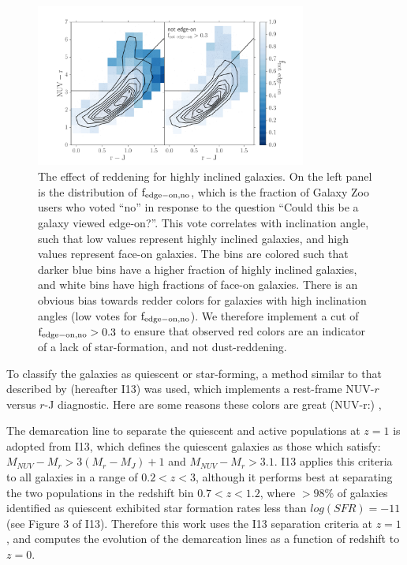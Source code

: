 \documentclass[useAMS,usenatbib]{mn2e}
\begin{document}
\begin{figure}
\centering
\includegraphics[width=3.5in,trim={1cm 0cm 1cm 1cm},clip]{figures/edgeon_colorcolor.pdf}
\caption{The effect of reddening for highly inclined galaxies. On the left panel is the distribution of $\rm f_{edge-on,no}$, which is the fraction of Galaxy Zoo users who voted ``no'' in response to the question ``Could this be a galaxy viewed edge-on?''. This vote correlates with inclination angle, such that low values represent highly inclined galaxies, and high values represent face-on galaxies. The bins are colored such that darker blue bins have a higher fraction of highly inclined galaxies, and white bins have high fractions of face-on galaxies. There is an obvious bias towards redder colors for galaxies with high inclination angles (low votes for $\rm f_{edge-on,no}$). We therefore implement a cut of $\rm f_{edge-on,no}>0.3$ to ensure that observed red colors are an indicator of a lack of star-formation, and not dust-reddening. }
\label{fig:edgeon}
\end{figure}
To classify the galaxies as quiescent or star-forming, a method similar to that described by \citet{Ilbert2013} (hereafter I13) was used, which implements a rest-frame NUV-$r$ versus $r$-J diagnostic. Here are some reasons these colors are great (NUV-r:) \citep{Arnouts2007a,Salim2005a,Wyder2007},\citep{Martin2007}

The demarcation line to separate the quiescent and active populations at $z=1$ is adopted from I13, which defines the quiescent galaxies as those which satisfy: $M_{NUV}-M_{r} > 3(M_{r}-M_{J})+1$ and $M_{NUV}-M_{r} > 3.1$. I13 applies this criteria to all galaxies in a range of $0.2<z<3$, although it performs best at separating the two populations in the redshift bin $0.7<z<1.2$, where $>98\%$ of galaxies identified as quiescent exhibited star formation rates less than $log(SFR) = -11$ (see Figure 3 of I13). Therefore this work uses the I13 separation criteria at $z=1$, and computes the evolution of the demarcation lines as a function of redshift to $z=0$. 
\end{document}
